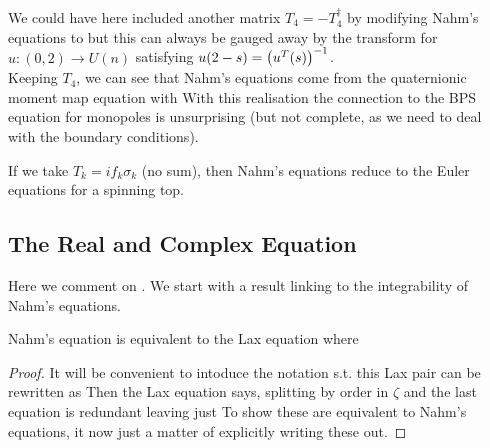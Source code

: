 \documentclass{article}
\begin{document}
\begin{remark}
	We could have here included another matrix $T_4 = -T_4^\dagger$ by modifying Nahm's equations to 
	but this can always be gauged away by the transform 
	for $u:(0,2) \to U(n)$ satisfying $u(2-s) = \left( u^T(s) \right)^{-1}$. \\
	Keeping $T_4$, we can see that Nahm's equations come from the quaternionic moment map equation with 
With this realisation the connection to the BPS equation for monopoles is unsurprising (but not complete, as we need to deal with the boundary conditions). 
\end{remark}

\begin{remark}
	If we take $T_k = i f_k \sigma_k$ (no sum), then Nahm's equations reduce to the Euler equations for a spinning top. 
\end{remark}

\subsection{The Real and Complex Equation}
Here we comment on \cite{Donaldson1984}. We start with a result linking to the integrability of Nahm's equations. 

\begin{prop}
	Nahm's equation is equivalent to the Lax equation 
	where 
\end{prop}
\begin{proof}
	It will be convenient to intoduce the notation 
	s.t. this Lax pair can be rewritten as 
	Then the Lax equation says, splitting by order in $\zeta$
	and the last equation is redundant leaving just
	To show these are equivalent to Nahm's equations, it now just a matter of explicitly writing these out. 
\end{proof}
\end{document}
